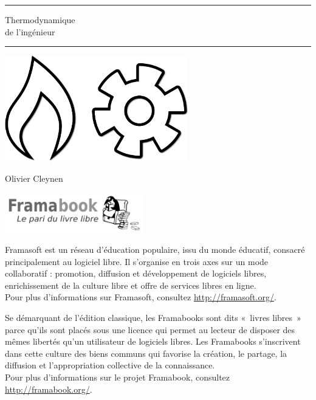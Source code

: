 \begin{titlepage}
\vspace*{4cm}
\begin{center}
	\vspace{1em}\par \rule{15cm}{.1pt}
	{\HUGE Thermodynamique\\ de l’ingénieur}
	\vspace{1em}\par \rule{15cm}{.1pt}

	\vspace{4cm}
	\includegraphics[width=8cm]{images/thermodynamics.png}
	\vspace{2cm}

	{\huge Olivier Cleynen}

	\hspace{0.5cm}\includegraphics[width=60mm]{images/Logo_framabook_grand.png}
\end{center}

\clearpage


\restoregeometry\pagestyle{empty}
\vspace*{5cm}
	Framasoft est un réseau d’éducation populaire, issu du monde éducatif, consacré principalement au logiciel libre. Il s’organise en trois axes sur un mode collaboratif : promotion, diffusion et développement de logiciels libres, enrichissement de la culture libre et offre de services libres en ligne.\\
	Pour plus d’informations sur Framasoft, consultez \href{http://framasoft.org/}{http://framasoft.org/}.

	Se démarquant de l’édition classique, les Framabooks sont dits «~livres libres~» parce qu’ils sont placés sous une licence qui permet au lecteur de disposer des mêmes libertés qu’un utilisateur de logiciels libres. Les Framabooks s’inscrivent dans cette culture des biens communs qui favorise la création, le partage, la diffusion et l’appropriation collective de la connaissance.\\
	Pour plus d’informations sur le projet Framabook, consultez \href{http://framabook.org/}{http://framabook.org/}.


\end{titlepage}
